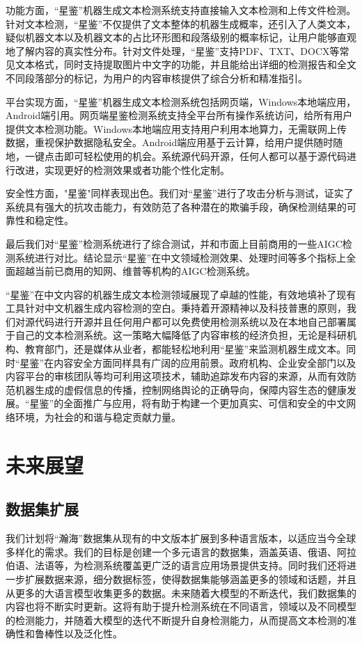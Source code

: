 \documentclass[a4paper]{report}
\begin{document}
功能方面，“星鉴”机器生成文本检测系统支持直接输入文本检测和上传文件检测。针对文本检测，“星鉴”不仅提供了文本整体的机器生成概率，还引入了人类文本，疑似机器文本以及机器文本的占比环形图和段落级别的概率标记，让用户能够直观地了解内容的真实性分布。针对文件处理，“星鉴”支持PDF、TXT、DOCX等常见文本格式，同时支持提取图片中文字的功能，并且能给出详细的检测报告和全文不同段落部分的标记，为用户的内容审核提供了综合分析和精准指引。

平台实现方面，“星鉴”机器生成文本检测系统包括网页端，Windows本地端应用，Android端引用。网页端星鉴检测系统支持全平台所有操作系统访问，给所有用户提供文本检测功能。Windows本地端应用支持用户利用本地算力，无需联网上传数据，重视保护数据隐私安全。Android端应用基于云计算，给用户提供随时随地，一键点击即可轻松使用的机会。系统源代码开源，任何人都可以基于源代码进行改进，实现更好的检测效果或者功能个性化定制。


安全性方面，"星鉴"同样表现出色。我们对“星鉴”进行了攻击分析与测试，证实了系统具有强大的抗攻击能力，有效防范了各种潜在的欺骗手段，确保检测结果的可靠性和稳定性。

最后我们对“星鉴”检测系统进行了综合测试，并和市面上目前商用的一些AIGC检测系统进行对比。结论显示“星鉴”在中文领域检测效果、处理时间等多个指标上全面超越当前已商用的知网、维普等机构的AIGC检测系统。

“星鉴”在中文内容的机器生成文本检测领域展现了卓越的性能，有效地填补了现有工具针对中文机器生成内容检测的空白。秉持着开源精神以及科技普惠的原则，我们对源代码进行开源并且任何用户都可以免费使用检测系统以及在本地自己部署属于自己的文本检测系统。这一策略大幅降低了内容审核的经济负担，无论是科研机构、教育部门，还是媒体从业者，都能轻松地利用“星鉴”来监测机器生成文本。同时“星鉴”在内容安全方面同样具有广阔的应用前景。政府机构、企业安全部门以及内容平台的审核团队等均可利用这项技术，辅助追踪发布内容的来源，从而有效防范机器生成的虚假信息的传播，控制网络舆论的正确导向，保障内容生态的健康发展。“星鉴”的全面推广与应用，将有助于构建一个更加真实、可信和安全的中文网络环境，为社会的和谐与稳定贡献力量。
\section{未来展望}
\subsection{数据集扩展}
我们计划将“瀚海”数据集从现有的中文版本扩展到多种语言版本，以适应当今全球多样化的需求。我们的目标是创建一个多元语言的数据集，涵盖英语、俄语、阿拉伯语、法语等，为检测系统覆盖更广泛的语言应用场景提供支持。同时我们还将进一步扩展数据来源，细分数据标签，使得数据集能够涵盖更多的领域和话题，并且从更多的大语言模型收集更多的数据。未来随着大模型的不断迭代，我们数据集的内容也将不断实时更新。这将有助于提升检测系统在不同语言，领域以及不同模型的检测能力，并随着大模型的迭代不断提升自身检测能力，从而提高文本检测的准确性和鲁棒性以及泛化性。
\end{document}
